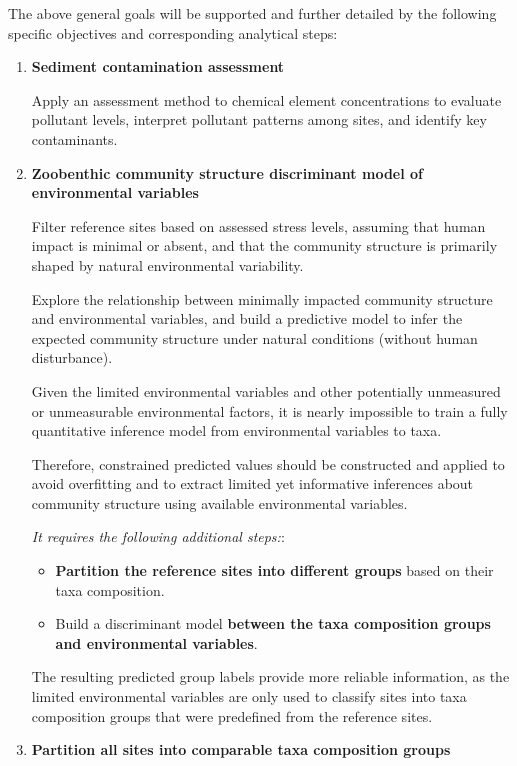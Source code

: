 The above general goals will be supported and further detailed by the following specific objectives and corresponding analytical steps:
\begin{enumerate}
    \item \textbf{Sediment contamination assessment}
    
    Apply an assessment method to chemical element concentrations to evaluate pollutant levels, 
    interpret pollutant patterns among sites, and identify key contaminants.

    \item \textbf{Zoobenthic community structure discriminant model of environmental variables}

    Filter reference sites based on assessed stress levels, assuming that human impact is minimal or absent, 
    and that the community structure is primarily shaped by natural environmental variability.

    Explore the relationship between minimally impacted community structure and environmental variables, 
    and build a predictive model to infer the expected community structure under natural conditions (without human disturbance).
    
    Given the limited environmental variables and other potentially unmeasured or unmeasurable environmental factors, 
    it is nearly impossible to train a fully quantitative inference model from environmental variables to taxa.

    Therefore, constrained predicted values should be constructed and applied to avoid overfitting 
    and to extract limited yet informative inferences about community structure using available environmental variables.

    \textit{It requires the following additional steps:}:
    \begin{itemize}
        \item \textbf{Partition the reference sites into different groups} based on their taxa composition.
        \item Build a discriminant model \textbf{between the taxa composition groups and environmental variables}.
    \end{itemize}

    The resulting predicted group labels provide more reliable information, as the limited 
    environmental variables are only used to classify sites into taxa composition groups that were 
    predefined from the reference sites.

    \item \textbf{Partition all sites into comparable taxa composition groups}
    

\end{enumerate}
